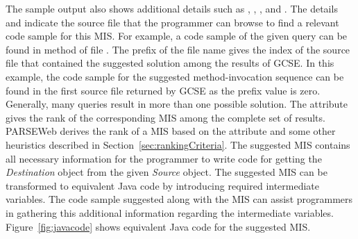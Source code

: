 The sample output also shows additional details 
such as , , , and . 
The details  and
 indicate the source file that the programmer can
browse to find a relevant code sample for this MIS. For example, a
code sample of the given query can be found in method
 of file . The prefix of the
file name gives the index of the source file that contained the
suggested solution among the results of GCSE. In this example, the
code sample for the suggested method-invocation sequence can be
found in the first source file returned by GCSE as the prefix value
is zero. Generally, many queries result in more than one possible
solution. The  attribute gives the rank of the
corresponding MIS among the complete set of results. PARSEWeb
derives the rank of a MIS based on the 
attribute and some other heuristics described in
Section~\ref{sec:rankingCriteria}. The suggested MIS contains all
necessary information for the programmer to write code for getting
the \emph{Destination} object from the given \emph{Source} object.
The suggested MIS can be transformed to equivalent Java code by
introducing required intermediate variables. The code sample
suggested along with the MIS can assist programmers in gathering
this additional information regarding the intermediate variables.
Figure~\ref{fig:javacode} shows equivalent Java code for the
suggested MIS.
